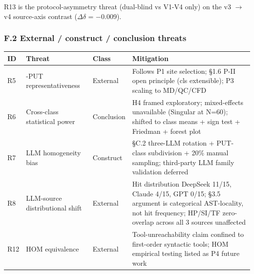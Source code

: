 \documentclass[review,12pt,authoryear]{elsarticle}
\newcounter{none}                   %
\begin{document}
R13 is the protocol-asymmetry threat (dual-blind vs V1-V4 only) on the
v3 $\to$ v4 source-axis contrast ($\Delta$$\delta$ = −0.009).

\subsubsection{F.2 External / construct / conclusion
threats}\label{f.2-external-construct-conclusion-threats}

{\def\LTcaptype{none} %
\begin{longtable}[]{@{}
  >{\raggedright\arraybackslash}p{}
  >{\raggedright\arraybackslash}p{}
  >{\raggedright\arraybackslash}p{}
  >{\raggedright\arraybackslash}p{}@{}}
\toprule\noalign{}
\begin{minipage}[b]{\linewidth}\raggedright
ID
\end{minipage} & \begin{minipage}[b]{\linewidth}\raggedright
Threat
\end{minipage} & \begin{minipage}[b]{\linewidth}\raggedright
Class
\end{minipage} & \begin{minipage}[b]{\linewidth}\raggedright
Mitigation
\end{minipage} \\
\midrule\noalign{}
\endhead
\bottomrule\noalign{}
\endlastfoot
R5 & 12-PUT representativeness & External & Follows P1 site selection;
§1.6 P-II open principle (cls extensible); P3 scaling to MD/QC/CFD \\
R6 & Cross-class statistical power & Conclusion & H4 framed exploratory;
mixed-effects unavailable (Singular at N=60); shifted to class means +
sign test + Friedman + forest plot \\
R7 & LLM homogeneity bias & Construct & §C.2 three-LLM rotation +
PUT-class subdivision + 20\% manual sampling; third-party LLM family
validation deferred \\
R8 & LLM-source distributional shift & External & Hit distribution
DeepSeek 11/15, Claude 4/15, GPT 0/15; §3.5 argument is categorical
AST-locality, not hit frequency; HP/SI/TF zero-overlap across all 3
sources unaffected \\
R12 & HOM equivalence & External & Tool-unreachability claim confined to
first-order syntactic tools; HOM empirical testing listed as P4 future
work \\
\end{longtable}
}
\end{document}
